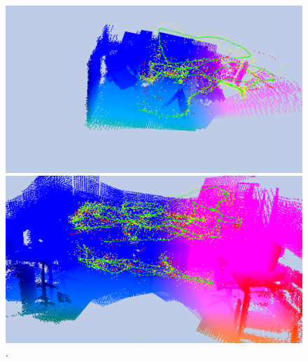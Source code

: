 \begin{figure}
	\centering
	
	\includegraphics[width=\linewidth]{results/models/fire}
	
	\includegraphics[width=\linewidth]{results/models/office}

	
	\caption[]{\label{fig:res_visualization1} .}
	
\end{figure}